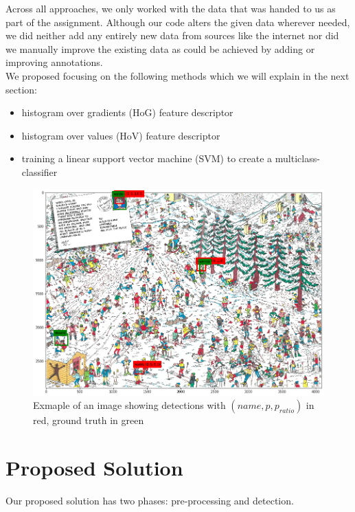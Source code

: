 \documentclass[11pt]{article}
\begin{document}
Across all approaches, we only worked with the data that was handed to us as part of the assignment.
Although our code alters the given data wherever needed, we did neither add any entirely new data from
sources like the internet nor did we manually improve the existing data as could be achieved by adding
or improving annotations.\\

We proposed focusing on the following methods which we will explain in the next section:

\begin{itemize}
    \item histogram over gradients (HoG) feature descriptor
    \item histogram over values (HoV) feature descriptor
    \item training a linear support vector machine (SVM) to create a multiclass-classifier
\end{itemize}


\begin{figure}
    \centering
    \includegraphics[width=0.9\linewidth]{figures/waldo_winter} 
    \caption{Exmaple of an image showing detections with \( (name, p, p_{ratio}) \) in red, ground truth in green}
    \label{fig:waldo-winter}
\end{figure}

\section{Proposed Solution}
Our proposed solution has two phases: pre-processing and detection.
\end{document}
